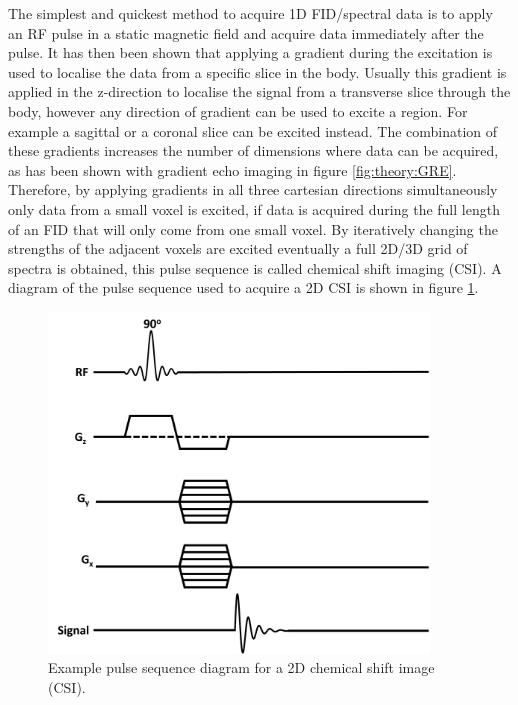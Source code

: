\documentclass[class=article, crop=false]{standalone}
\begin{document}
The simplest and quickest method to acquire 1D FID/spectral data is to apply an RF pulse in a static magnetic field and acquire data immediately after the pulse. It has then been shown that applying a gradient during the excitation is used to localise the data from a specific slice in the body. Usually this gradient is applied in the z-direction to localise the signal from a transverse slice through the body, however any direction of gradient can be used to excite a region. For example a sagittal or a coronal slice can be excited instead. The combination of these gradients increases the number of dimensions where data can be acquired, as has been shown with gradient echo imaging in figure \ref{fig:theory:GRE}. Therefore, by applying gradients in all three cartesian directions simultaneously only data from a small voxel is excited, if data is acquired during the full length of an FID that will only come from one small voxel. By iteratively changing the strengths of the adjacent voxels are excited eventually a full 2D/3D grid of spectra is obtained, this pulse sequence is called chemical shift imaging (CSI). A diagram of the pulse sequence used to acquire a 2D CSI is shown in figure \ref{fig:theory:CSI}.

\begin{figure}[h]
    \centering
    \includegraphics[width=0.9\textwidth]{Figures/Theory/CSI_sequence.png}
    \caption{Example pulse sequence diagram for a 2D chemical shift image (CSI).}
    \label{fig:theory:CSI}
\end{figure}
\end{document}
